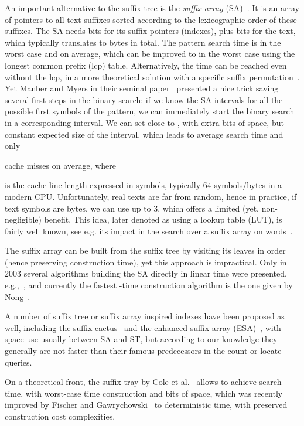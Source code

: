 \documentclass{cai}
\begin{document}
An important alternative to the suffix tree is the {\em suffix array} (SA)~\cite{MM90}.
It is an array of  pointers to all text suffixes 
sorted according to the lexicographic order of these suffixes.
The SA needs  bits for its  suffix pointers (indexes), 
plus  bits for the text, which typically translates to  
bytes in total.
The pattern search time is  in the worst case 
and  on average,
which can be
improved to  in the worst case 
using the longest common prefix (lcp) table.
Alternatively, the  time can be reached even without the lcp,
in a more theoretical solution with a specific suffix permutation~\cite{DBLP:journals/talg/FranceschiniG08}.
Yet Manber and Myers in their seminal paper~\cite{MM90} presented a nice 
trick saving several first steps in the binary search:
if we know the SA intervals for all the possible first  symbols of the
pattern, we can immediately start the binary search in a corresponding interval.
We can set  close to , with  extra bits of
space, but constant expected size of the interval, which leads to  average
search time and only 
 
cache misses on average, 
where 

is the cache line length expressed in symbols,  
typically 64 symbols/bytes in a modern CPU.
Unfortunately, real texts are far from random, hence in practice, 
if text symbols are bytes, 
we can use  up to 3, which offers a limited (yet, non-negligible)
benefit.
This idea, later denoted as using a lookup table (LUT), is fairly well known, 
see e.g. its impact in the search over a suffix array on words~\cite{DBLP:conf/cpm/FerraginaF07}.

The suffix array can be built from the suffix tree by visiting its leaves 
in order (hence preserving  construction time), yet this approach is 
impractical.
Only in 2003 several algorithms building the SA directly in linear time 
were presented, e.g.,~\cite{KS03}, and currently the fastest -time 
construction algorithm is the one given by Nong~\cite{NZC11}.

A number of suffix tree or suffix array inspired indexes have been proposed 
as well, including the suffix cactus~\cite{karkkainen1995suffix} and the 
enhanced suffix array (ESA)~\cite{abouelhoda2002enhanced}, with space use usually 
between SA and ST, 
but according to our knowledge they generally are not faster than their 
famous predecessors in the count or locate queries.

On a theoretical front, the suffix tray by Cole et al.~\cite{cole2006suffix} 
allows to achieve  search time, with  worst-case 
time construction and  bits of space, which was recently improved 
by Fischer and Gawrychowski~\cite{FG15} 
to  deterministic time, with preserved construction 
cost complexities.
\end{document}
